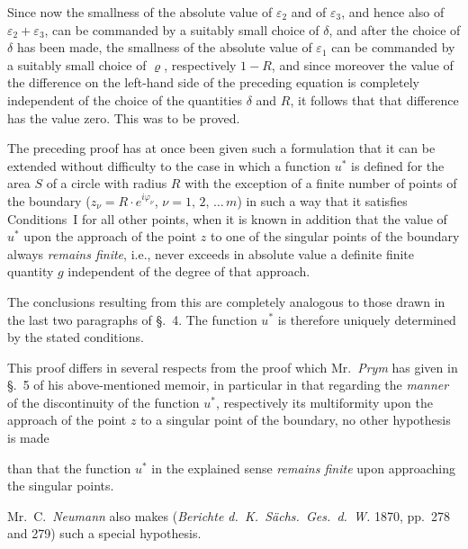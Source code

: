 \documentclass{article}
\begin{document}
Since now the smallness of the absolute value of $\varepsilon_2$ and of $\varepsilon_3$, and hence also of $\varepsilon_2 + \varepsilon_3$, can be commanded by a suitably small choice of $\delta$, and after the choice of $\delta$ has been made, the smallness of the absolute value of $\varepsilon_1$ can be commanded by a suitably small choice of $\varrho$, respectively $1 - R$, and since moreover the value of the difference on the left-hand side of the preceding equation is completely independent of the choice of the quantities $\delta$ and $R$, it follows that that difference has the value zero. This was to be proved.



The preceding proof has at once been given such a formulation that it can be extended without difficulty to the case in which a function $u^*$ is defined for the area $S$ of a circle with radius $R$ with the exception of a finite number of points of the boundary ($z_\nu = R \cdot e^{i\varphi_\nu}$, $\nu = 1, \, 2, \, \dots \, m$) in such a way that it satisfies Conditions~I for all other points, when it is known in addition that the value of $u^*$ upon the approach of the point $z$ to one of the singular points of the boundary always \emph{remains finite}, i.e., never exceeds in absolute value a definite finite quantity $g$ independent of the degree of that approach.



The conclusions resulting from this are completely analogous to those drawn in the last two paragraphs of §.~4. The function $u^*$ is therefore uniquely determined by the stated conditions.



This proof differs in several respects from the proof which Mr.~\emph{Prym} has given in §.~5 of his above-mentioned memoir, in particular in that regarding the \emph{manner} of the discontinuity of the function $u^*$, respectively its multiformity upon the approach of the point $z$ to a singular point of the boundary, no other hypothesis is made




than that the function $u^*$ in the explained sense \emph{remains finite} upon approaching the singular points.



Mr.~C.~\emph{Neumann} also makes (\emph{Berichte d.~K.~Sächs.~Ges.~d.~W.} 1870, pp.~278 and 279) such a special hypothesis.
\end{document}
